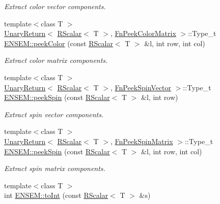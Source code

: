 \begin{DoxyCompactItemize}
\begin{DoxyCompactList}\small\item\em Extract color vector components. \end{DoxyCompactList}\item 
{\footnotesize template$<$class T $>$ }\\\mbox{\hyperlink{structENSEM_1_1UnaryReturn}{Unary\+Return}}$<$ \mbox{\hyperlink{classENSEM_1_1RScalar}{R\+Scalar}}$<$ T $>$, \mbox{\hyperlink{structENSEM_1_1FnPeekColorMatrix}{Fn\+Peek\+Color\+Matrix}} $>$\+::Type\+\_\+t \mbox{\hyperlink{group__rscalar_ga692303fb1e668f95b9363df896b04842}{E\+N\+S\+E\+M\+::peek\+Color}} (const \mbox{\hyperlink{classENSEM_1_1RScalar}{R\+Scalar}}$<$ T $>$ \&l, int row, int col)
\begin{DoxyCompactList}\small\item\em Extract color matrix components. \end{DoxyCompactList}\item 
{\footnotesize template$<$class T $>$ }\\\mbox{\hyperlink{structENSEM_1_1UnaryReturn}{Unary\+Return}}$<$ \mbox{\hyperlink{classENSEM_1_1RScalar}{R\+Scalar}}$<$ T $>$, \mbox{\hyperlink{structENSEM_1_1FnPeekSpinVector}{Fn\+Peek\+Spin\+Vector}} $>$\+::Type\+\_\+t \mbox{\hyperlink{group__rscalar_gae91157ec10379f83a648e992a01ce0c6}{E\+N\+S\+E\+M\+::peek\+Spin}} (const \mbox{\hyperlink{classENSEM_1_1RScalar}{R\+Scalar}}$<$ T $>$ \&l, int row)
\begin{DoxyCompactList}\small\item\em Extract spin vector components. \end{DoxyCompactList}\item 
{\footnotesize template$<$class T $>$ }\\\mbox{\hyperlink{structENSEM_1_1UnaryReturn}{Unary\+Return}}$<$ \mbox{\hyperlink{classENSEM_1_1RScalar}{R\+Scalar}}$<$ T $>$, \mbox{\hyperlink{structENSEM_1_1FnPeekSpinMatrix}{Fn\+Peek\+Spin\+Matrix}} $>$\+::Type\+\_\+t \mbox{\hyperlink{group__rscalar_gafc1d2e7916b4f394f3c5aa75ce62b421}{E\+N\+S\+E\+M\+::peek\+Spin}} (const \mbox{\hyperlink{classENSEM_1_1RScalar}{R\+Scalar}}$<$ T $>$ \&l, int row, int col)
\begin{DoxyCompactList}\small\item\em Extract spin matrix components. \end{DoxyCompactList}\item 
{\footnotesize template$<$class T $>$ }\\int \mbox{\hyperlink{group__rscalar_ga7507e0e1da7cf75743141d70fd7150c8}{E\+N\+S\+E\+M\+::to\+Int}} (const \mbox{\hyperlink{classENSEM_1_1RScalar}{R\+Scalar}}$<$ T $>$ \&s)

\end{DoxyCompactItemize}
